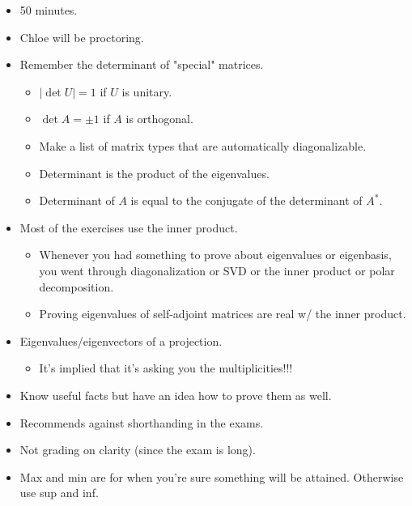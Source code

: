 \documentclass[../../notes.tex]{subfiles}
\begin{document}
\begin{itemize}
    \item 50 minutes.
    \item Chloe will be proctoring.
    \item Remember the determinant of "special" matrices.
    \begin{itemize}
        \item $|\det U|=1$ if $U$ is unitary.
        \item $\det A=\pm 1$ if $A$ is orthogonal.
        \item Make a list of matrix types that are automatically diagonalizable.
        \item Determinant is the product of the eigenvalues.
        \item Determinant of $A$ is equal to the conjugate of the determinant of $A^*$.
    \end{itemize}
    \item Most of the exercises use the inner product.
    \begin{itemize}
        \item Whenever you had something to prove about eigenvalues or eigenbasis, you went through diagonalization or SVD or the inner product or polar decomposition.
        \item Proving eigenvalues of self-adjoint matrices are real w/ the inner product.
    \end{itemize}
    \item Eigenvalues/eigenvectors of a projection.
    \begin{itemize}
        \item It's implied that it's asking you the multiplicities!!!
    \end{itemize}
    \item Know useful facts but have an idea how to prove them as well.
    \item Recommends against shorthanding in the exams.
    \item Not grading on clarity (since the exam is long).
    \item Max and min are for when you're sure something will be attained. Otherwise use sup and inf.
\end{itemize}
\end{document}
